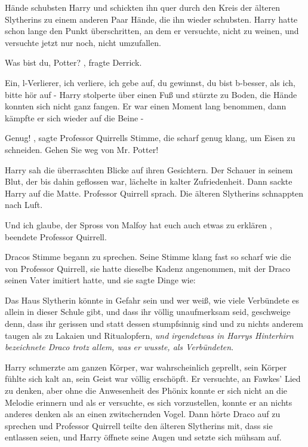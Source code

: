 Hände schubsten Harry und schickten ihn quer durch den Kreis der älteren
Slytherins zu einem anderen Paar Hände, die ihn wieder schubsten. Harry hatte
schon lange den Punkt überschritten, an dem er versuchte, nicht zu weinen, und
versuchte jetzt nur noch, nicht umzufallen.

\glqq Was bist du, Potter?\grqq{} , fragte Derrick.

\glqq Ein, l-Verlierer, ich verliere, ich gebe auf, du gewinnst, du bist
b-besser, als ich, bitte hör auf -\grqq{} Harry stolperte über einen Fuß und
stürzte zu Boden, die Hände konnten sich nicht ganz fangen. Er war einen Moment
lang benommen, dann kämpfte er sich wieder auf die Beine -

\glqq Genug!\grqq{} , sagte Professor Quirrells Stimme, die scharf genug klang,
um Eisen zu schneiden. \glqq Gehen Sie weg von Mr. Potter!\grqq{}

Harry sah die überraschten Blicke auf ihren Gesichtern. Der Schauer in seinem
Blut, der bis dahin geflossen war, lächelte in kalter Zufriedenheit. Dann sackte
Harry auf die Matte. Professor Quirrell sprach. Die älteren Slytherins
schnappten nach Luft.

\glqq Und ich glaube, der Spross von Malfoy hat euch auch etwas zu
erklären\grqq{} , beendete Professor Quirrell.

Dracos Stimme begann zu sprechen. Seine Stimme klang fast so scharf wie die von
Professor Quirrell, sie hatte dieselbe Kadenz angenommen, mit der Draco seinen
Vater imitiert hatte, und sie sagte Dinge wie:

\glqq Das Haus Slytherin könnte in Gefahr sein und wer weiß, wie viele
Verbündete es allein in dieser Schule gibt, und dass ihr völlig unaufmerksam
seid, geschweige denn, dass ihr gerissen und statt dessen stumpfsinnig sind und
zu nichts anderem taugen als zu Lakaien und Ritualopfern, \emph{und irgendetwas
in Harrys Hinterhirn bezeichnete Draco trotz allem, was er wusste, als
Verbündeten}.

Harry schmerzte am ganzen Körper, war wahrscheinlich geprellt, sein Körper
fühlte sich kalt an, sein Geist war völlig erschöpft. Er versuchte, an Fawkes'
Lied zu denken, aber ohne die Anwesenheit des Phönix konnte er sich nicht an die
Melodie erinnern und als er versuchte, es sich vorzustellen, konnte er an nichts
anderes denken als an einen zwitschernden Vogel. Dann hörte Draco auf zu
sprechen und Professor Quirrell teilte den älteren Slytherins mit, dass sie
entlassen seien, und Harry öffnete seine Augen und setzte sich mühsam auf.

